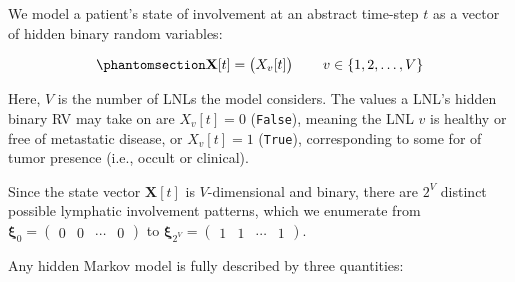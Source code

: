 \documentclass[
  sn-mathphys-num,
]{sn-jnl}
\begin{document}
We model a patient's state of involvement at an abstract time-step \(t\)
as a vector of hidden binary random variables:

\begin{equation}\phantomsection\label{eq-state-def}{
\mathbf{X}[t] = \begin{pmatrix} X_v[t] \end{pmatrix} \qquad v \in \left\{ 1, 2, \ldots, V \right\}
}\end{equation}

Here, \(V\) is the number of LNLs the model considers. The values a
LNL's hidden binary RV may take on are \(X_v[t] = 0\) (\texttt{False}),
meaning the LNL \(v\) is healthy or free of metastatic disease, or
\(X_v[t] = 1\) (\texttt{True}), corresponding to some for of tumor
presence (i.e., occult or clinical).

Since the state vector \(\mathbf{X}[t]\) is \(V\)-dimensional and
binary, there are \(2^V\) distinct possible lymphatic involvement
patterns, which we enumerate from
\(\boldsymbol{\xi}_0 = \begin{pmatrix} 0 & 0 & \cdots & 0 \end{pmatrix}\)
to
\(\boldsymbol{\xi}_{2^V} = \begin{pmatrix} 1 & 1 & \cdots & 1 \end{pmatrix}\).

Any hidden Markov model is fully described by three quantities:
\end{document}
